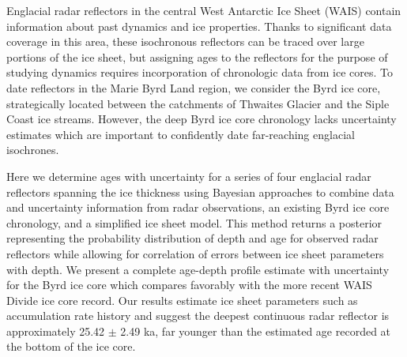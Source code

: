 Englacial radar reflectors in the central West Antarctic Ice Sheet (WAIS) contain information about past dynamics and ice properties. Thanks to significant data coverage in this area, these isochronous reflectors can be traced over large portions of the ice sheet, but assigning ages to the reflectors for the purpose of studying dynamics requires incorporation of chronologic data from ice cores. To date reflectors in the Marie Byrd Land region, we consider the Byrd ice core, strategically located between the catchments of Thwaites Glacier and the Siple Coast ice streams. However, the deep Byrd ice core chronology lacks uncertainty estimates which are important to confidently date far-reaching englacial isochrones. 

Here we determine ages with uncertainty for a series of four englacial radar reflectors spanning the ice thickness using Bayesian approaches to combine data and uncertainty information from radar observations, an existing Byrd ice core chronology, and a simplified ice sheet model. This method returns a posterior representing the probability distribution of depth and age for observed radar reflectors while allowing for correlation of errors between ice sheet parameters with depth. We present a complete age-depth profile estimate with uncertainty for the Byrd ice core which compares favorably with the more recent WAIS Divide ice core record. Our results estimate ice sheet parameters such as accumulation rate history and suggest the deepest continuous radar reflector is approximately 25.42 $\pm$ 2.49 ka, far younger than the estimated age recorded at the bottom of the ice core. 